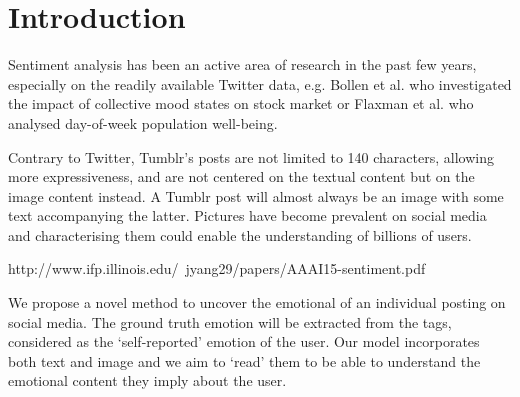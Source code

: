 \chapter{Introduction}

Sentiment analysis has been an active area of research in the past few years, especially on the readily available Twitter data, e.g. Bollen et al. \cite{bollen} who investigated the impact of collective mood states on stock market or Flaxman et al. \cite{seth-twitter} who analysed day-of-week population well-being.

Contrary to Twitter, Tumblr's posts are not limited to 140 characters, allowing more expressiveness, and are not centered on the textual content but on the image content instead. A Tumblr post will almost always be an image with some text accompanying the latter. Pictures have become prevalent on social media and characterising them could enable the understanding of billions of users. 

http://www.ifp.illinois.edu/~jyang29/papers/AAAI15-sentiment.pdf

We propose a novel method to uncover the emotional of an individual posting on social media. The ground truth emotion will be extracted from the tags, considered as the `self-reported' emotion of the user. Our model incorporates both text and image and we aim to `read' them to be able to understand the emotional content they imply about the user.










